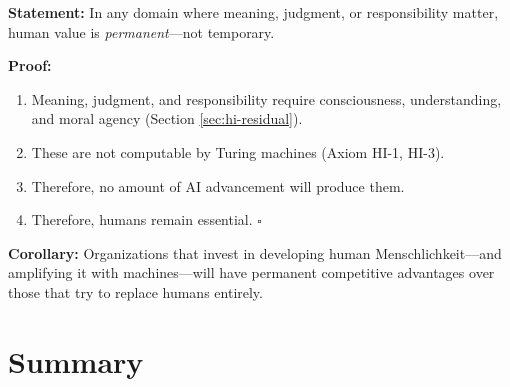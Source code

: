 \begin{tcolorbox}[colback=green!5!white, colframe=green!75!black,
    title=\textbf{Theorem AF-3: The Permanent Value of Humans}]
\textbf{Statement:} In any domain where meaning, judgment, or responsibility matter, human value is \textit{permanent}---not temporary.

\textbf{Proof:}
\begin{enumerate}
    \item Meaning, judgment, and responsibility require consciousness, understanding, and moral agency (Section \ref{sec:hi-residual}).
    \item These are not computable by Turing machines (Axiom HI-1, HI-3).
    \item Therefore, no amount of AI advancement will produce them.
    \item Therefore, humans remain essential. \hfill $\square$
\end{enumerate}

\textbf{Corollary:} Organizations that invest in developing human Menschlichkeit---and amplifying it with machines---will have permanent competitive advantages over those that try to replace humans entirely.
\end{tcolorbox}


\section{Summary}
\label{sec:hi-summary}

